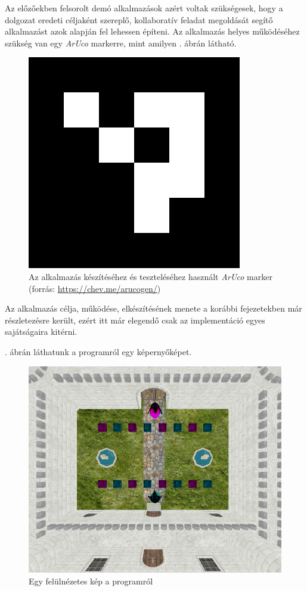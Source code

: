 
Az előzőekben felsorolt demó alkalmazások azért voltak szükségesek, hogy a dolgozat eredeti céljaként szereplő, kollaboratív feladat megoldását segítő alkalmazást azok alapján fel lehessen építeni.
Az alkalmazás helyes működéséhez szükség van egy \textit{ArUco} markerre, mint amilyen . ábrán látható.

\begin{figure}[htp]
	\centering
	\includegraphics[scale=0.5]{images/marker.png}
	\caption{Az alkalmazás készítéséhez és teszteléséhez használt \textit{ArUco} marker (forrás: \url{https://chev.me/arucogen/})}
	\label{fig:marker}
\end{figure}

Az alkalmazás célja, működése, elkészítésének menete a korábbi fejezetekben már részletezésre került, ezért itt már elegendő csak az implementáció egyes sajátságaira kitérni.

. ábrán láthatunk a programról egy képernyőképet.

\begin{figure}[htp]
	\centering
	\includegraphics[scale=0.7]{images/game.png}
	\caption{Egy felülnézetes kép a programról}
	\label{fig:game}
\end{figure}

